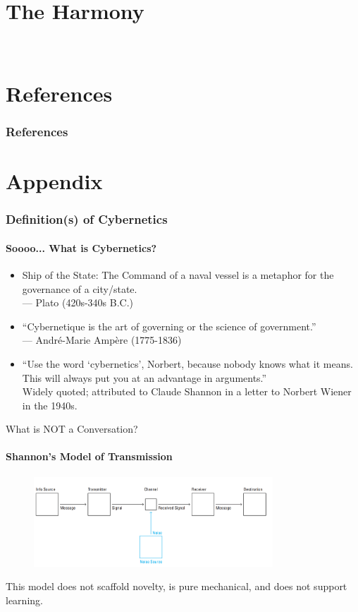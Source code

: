\documentclass[
	11pt,
	aspectratio=169,
]{beamer}
\begin{document}
    \section{The Harmony}
        \


\section{References}
	\begin{frame}[allowframebreaks]
		\frametitle{References}
		\printbibliography
	\end{frame}

\section*{Appendix}
	\begin{frame}
		\frametitle{Definition(s) of Cybernetics}
		\framesubtitle{Soooo... What is Cybernetics?}
		\begin{itemize}
			\item<1->Ship of the State: The Command of a naval vessel is a metaphor for the governance of a city/state.\\
			--- Plato (420s-340s B.C.)
			\item<2->``Cybernetique is the art of governing or the science of government.''\\
			--- André-Marie Ampère (1775-1836)
			\item<3->``Use the word ‘cybernetics’, Norbert, because nobody knows what it means. This will always put you at an advantage in arguments.''\\
			Widely quoted; attributed to Claude Shannon in a letter to Norbert Wiener in the 1940s.
		\end{itemize}
	\end{frame}
	\begin{frame}{What is NOT a Conversation?}
        \framesubtitle{Shannon's Model of Transmission}
        \begin{figure}
            \centering\includegraphics[width=0.8\textwidth]{resources/transmission.PNG}
        \end{figure}
        This model does not scaffold novelty, is pure mechanical, and does not support learning.
    \end{frame}
\end{document}
